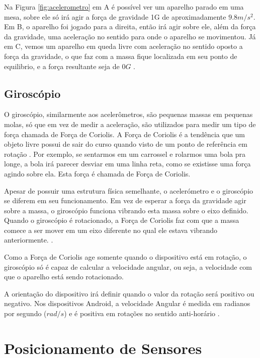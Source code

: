 	
Na Figura \ref{fig:acelerometro} em A é possível ver um aparelho parado em uma mesa, sobre ele só irá agir a força de gravidade 1G de aproximadamente $9.8 m/s^{2}$. Em  B, o aparelho foi jogado para a direita, então irá agir sobre ele, além da força da gravidade, uma aceleração no sentido para onde o aparelho se movimentou. Já em C, vemos um aparelho em queda livre com aceleração no sentido oposto a força da gravidade, o que faz com a massa fique localizada em seu ponto de equilibrio, e a força resultante  seja de $0G$ \citep{milette2012professional}.


\subsection{Giroscópio}
	
	O giroscópio, similarmente aos acelerômetros, são pequenas massas em pequenas molas, só que em vez de medir a aceleração, são utilizados para medir um tipo de força chamada de Força de Coriolis. A Força de Coriolis é a tendência que um objeto livre possui de sair do curso quando visto de um ponto de referência em rotação \citep{milette2012professional}. Por exemplo, se sentarmos em um carrossel e rolarmos uma bola pra longe, a bola irá parecer desviar em uma linha reta, como se existisse uma força agindo sobre ela. Esta força é chamada de Força de Coriolis.
	
	Apesar de possuir uma estrutura física semelhante, o acelerómetro e o giroscópio se diferem em seu funcionamento. Em vez de esperar a força da gravidade agir sobre a massa, o giroscópio funciona vibrando esta massa sobre o eixo definido. Quando o giroscópio é rotacionado, a Força de Coriolis faz com que a massa comece a ser mover em um eixo diferente no qual ele estava vibrando anteriormente.  \cite{milette2012professional}.
	
	Como a Força de Coriolis age somente quando o dispositivo está em rotação, o giroscópio só é capaz de calcular a velocidade angular, ou seja, a velocidade com que o aparelho está sendo rotacionado. 
	
	A orientação do dispositivo irá definir quando o valor da rotação será positivo ou negativo. Nos dispositivos Android, a velocidade Angular é medida em radianos por segundo ($rad/s$) e é positiva em rotações no sentido anti-horário \citep{GyroscopeAndroidDocs}. 
	
\section{Posicionamento de Sensores}
\label{sec:sensor_position}

